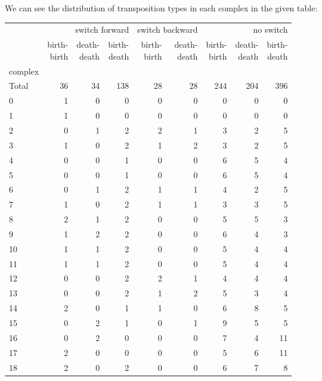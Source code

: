 \documentclass{article}
\begin{document}
\par We can see the distribution of transposition types in each complex in the given table:
\begin{center}
\begin{tabular}{lrrrrrrrr}
\toprule
& \multicolumn{3}{r}{switch forward} & \multicolumn{2}{r}{switch backward} & \multicolumn{3}{r}{no switch} \\
& \makecell{birth-\\birth} & \makecell{death-\\death} & \makecell{birth-\\death} & \makecell{birth-\\birth} & \makecell{death-\\death} & \makecell{birth-\\birth} & \makecell{death-\\death} & \makecell{birth-\\death} \\
complex &  &  &  &  &  &  &  &  \\
\midrule
Total & 36 & 34 & 138 & 28 & 28 & 244 & 204 & 396 \\
0 & 1 & 0 & 0 & 0 & 0 & 0 & 0 & 0 \\
1 & 1 & 0 & 0 & 0 & 0 & 0 & 0 & 0 \\
2 & 0 & 1 & 2 & 2 & 1 & 3 & 2 & 5 \\
3 & 1 & 0 & 2 & 1 & 2 & 3 & 2 & 5 \\
4 & 0 & 0 & 1 & 0 & 0 & 6 & 5 & 4 \\
5 & 0 & 0 & 1 & 0 & 0 & 6 & 5 & 4 \\
6 & 0 & 1 & 2 & 1 & 1 & 4 & 2 & 5 \\
7 & 1 & 0 & 2 & 1 & 1 & 3 & 3 & 5 \\
8 & 2 & 1 & 2 & 0 & 0 & 5 & 5 & 3 \\
9 & 1 & 2 & 2 & 0 & 0 & 6 & 4 & 3 \\
10 & 1 & 1 & 2 & 0 & 0 & 5 & 4 & 4 \\
11 & 1 & 1 & 2 & 0 & 0 & 5 & 4 & 4 \\
12 & 0 & 0 & 2 & 2 & 1 & 4 & 4 & 4 \\
13 & 0 & 0 & 2 & 1 & 2 & 5 & 3 & 4 \\
14 & 2 & 0 & 1 & 1 & 0 & 6 & 8 & 5 \\
15 & 0 & 2 & 1 & 0 & 1 & 9 & 5 & 5 \\
16 & 0 & 2 & 0 & 0 & 0 & 7 & 4 & 11 \\
17 & 2 & 0 & 0 & 0 & 0 & 5 & 6 & 11 \\
18 & 2 & 0 & 2 & 0 & 0 & 6 & 7 & 8 \\

\end{tabular}
\end{center}
\end{document}
